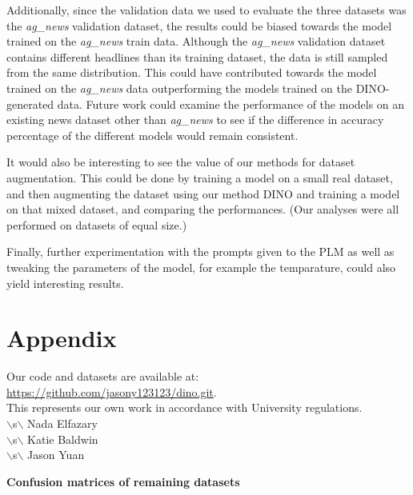 \documentclass[11pt]{article}
\begin{document}
Additionally, since the validation data we used to evaluate the three datasets was the \textit{ag\_news} validation dataset, the results could be biased towards the model trained on the \textit{ag\_news} train data. Although the \textit{ag\_news} validation dataset contains different headlines than its training dataset, the data is still sampled from the same distribution. This could have contributed towards the model trained on the \textit{ag\_news} data outperforming the models trained on the DINO-generated data. Future work could examine the performance of the models on an existing news dataset other than \textit{ag\_news} to see if the difference in accuracy percentage of the different models would remain consistent.

It would also be interesting to see the value of our methods for dataset augmentation. This could be done by training a model on a small real dataset, and then augmenting the dataset using our method DINO and training a model on that mixed dataset, and comparing the performances. (Our analyses were all performed on datasets of equal size.)

Finally, further experimentation with the prompts given to the PLM as well as tweaking the parameters of the model, for example the temparature, could also yield interesting results.






\appendix

\section{Appendix}
\label{sec:appendix}

Our code and datasets are available at: \url{https://github.com/jasony123123/dino.git}. \\

This represents our own work in accordance with University regulations.
\\
$\backslash$s$\backslash$ Nada Elfazary\\
$\backslash$s$\backslash$ Katie Baldwin\\
$\backslash$s$\backslash$ Jason Yuan\\

\clearpage

\textbf{Confusion matrices of remaining datasets}
\end{document}
